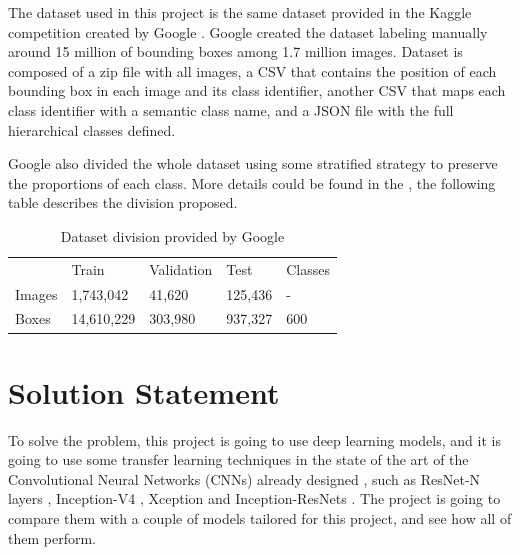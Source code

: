 \documentclass[11pt]{article}
\begin{document}
The dataset used in this project is the same dataset provided in the Kaggle competition created by Google \cite{kaggle}. Google created the dataset labeling manually around 15 million of bounding boxes among 1.7 million images. Dataset is composed of a zip file with all images, a CSV that contains the position of each bounding box in each image and its class identifier, another CSV that maps each class identifier with a semantic class name, and a JSON file with the full hierarchical classes defined.

Google also divided the whole dataset using some stratified strategy to preserve the proportions of each class. More details could be found in the \cite{imgdataset}, the following table describes the division proposed.

\begin{table}[ht]
	\centering
	\caption{ Dataset division provided by Google }
	\label{table1}
	\begin{tabular}{@{}p{3cm}p{2cm}p{2cm}p{2cm}p{1.5cm}@{}}
		\rowcolor[HTML]{EFEFEF}
		& \multicolumn{1}{l}{\cellcolor[HTML]{EFEFEF}Train} & \multicolumn{1}{l}{\cellcolor[HTML]{EFEFEF}Validation} & \multicolumn{1}{l}{\cellcolor[HTML]{EFEFEF}Test} & \multicolumn{1}{l}{\cellcolor[HTML]{EFEFEF}Classes} \\
		Images & 1,743,042                                         & 41,620                                                 & 125,436                                          & -                                                      \\
		Boxes  & 14,610,229                                        & 303,980                                                & 937,327                                          & 600                                                    \\
	\end{tabular}
\end{table}



\section{Solution Statement}

To solve the problem, this project is going to use deep learning models, and it is going to use some transfer learning techniques in the state of the art of the Convolutional Neural Networks (CNNs) already designed \cite{cnns}, such as ResNet-N layers \cite{resnet}, Inception-V4 \cite{inception}, Xception \cite{xception} and Inception-ResNets \cite{inception}. The project is going to compare them with a couple of models tailored for this project, and see how all of them perform.
\end{document}

